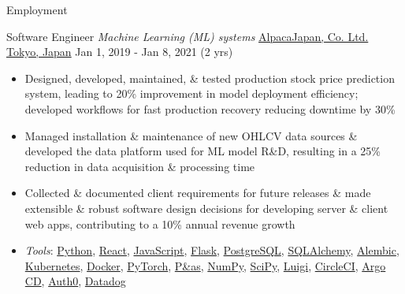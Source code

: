 \documentclass[]{mcdowellcv}
\begin{document}
\begin{cvsection}{Employment}
  \begin{cvsubsection}
    {Software Engineer \linebreak \textit{Machine Learning (ML) systems}}
    {\href{https://www.alpaca.markets/jp/about.html}{AlpacaJapan, Co. Ltd. \linebreak Tokyo, Japan}}
      {Jan 1, 2019 - Jan 8, 2021 (2 yrs)}
    \begin{itemize}
      \item
            Designed, developed, maintained, \& tested production stock price
            prediction system, leading to 20\% improvement in model deployment
            efficiency; developed workflows for fast production recovery
            reducing downtime by 30\%
      \item
            Managed installation \& maintenance of new OHLCV data sources \&
            developed the data platform used for ML model R\&D, resulting in
            a 25\% reduction in data acquisition \& processing time
      \item
            Collected \& documented client requirements for future releases \&
            made extensible \& robust software design decisions for developing
            server \& client web apps, contributing to a 10\% annual revenue
            growth
      \item
            \textit{Tools}:
            \href{https://www.python.org/}{Python},
            \href{https://react.dev/}{React},
            \href{https://developer.mozilla.org/en-US/docs/Web/JavaScript}{JavaScript},
            \href{https://flask.palletsprojects.com/}{Flask},
            \href{https://www.postgresql.org/}{PostgreSQL},
            \href{https://www.sqlalchemy.org/}{SQLAlchemy},
            \href{https://alembic.sqlalchemy.org/en/latest/}{Alembic},
            \href{https://kubernetes.io/}{Kubernetes},
            \href{https://www.docker.com/}{Docker},
            \href{https://pytorch.org/}{PyTorch},
            \href{https://p\&as.pydata.org/}{P\&as},
            \href{https://numpy.org/}{NumPy}, \href{https://scipy.org/}{SciPy},
            \href{https://github.com/spotify/luigi}{Luigi},
            \href{https://circleci.com/}{CircleCI},
            \href{https://argoproj.github.io/cd/}{Argo CD},
            \href{https://auth0.com/}{Auth0},
            \href{https://www.datadoghq.com/}{Datadog}
    \end{itemize}
  \end{cvsubsection}


\end{cvsection}
\end{document}
